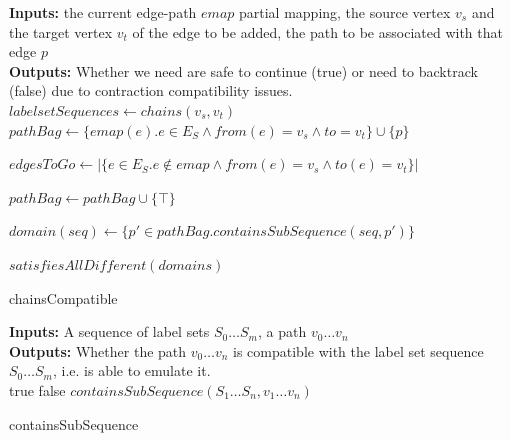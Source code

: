 \begin{algorithm}
\SetAlgoLined
\LinesNumbered
\textbf{Inputs: } the current edge-path $\mathit{emap}$ partial mapping, the source vertex $v_s$ and the target vertex $v_t$ of the edge to be added, the path to be associated with that edge $p$\\
\textbf{Outputs: } Whether we need are safe to continue (true) or need to backtrack (false) due to contraction compatibility issues.\\
$\mathit{labelsetSequences} \longleftarrow \mathit{chains}(v_s, v_t)$\;
$\mathit{pathBag} \longleftarrow \{\mathit{emap}(e) . e \in E_S \land \mathit{from}(e)=v_s \land \mathit{to}=v_t \} \cup \{p\}$\;

$\mathit{edgesToGo} \longleftarrow |\{e \in E_S . e \not \in \mathit{emap} \land \mathit{from}(e)=v_s \land \mathit{to}(e)=v_t\}|$

 {
		$\mathit{pathBag}\longleftarrow \mathit{pathBag} \cup \{\top\}$\;	
}

 {
	$\mathit{domain}(\mathit{seq})\longleftarrow \{p' \in \mathit{pathBag} . \mathit{containsSubSequence}(\mathit{seq}, p')\}$\;
}

\Return $\mathit{satisfiesAllDifferent}(\mathit{domains})$\;

 \caption{chainsCompatible}
 \label{algorithm:chainsCompatible}
\end{algorithm}


\begin{algorithm}
\SetAlgoLined
\LinesNumbered
\textbf{Inputs: } A sequence of label sets $S_0 \dots S_m$, a path $v_0 \dots v_n$\\
\textbf{Outputs: } Whether the path $v_0 \dots v_n$ is compatible with the label set sequence $S_0 \dots S_m$, i.e. is able to emulate it.\\
  {
	\Return true\;
}  {
	\Return false\;
}  {
	\Return $\mathit{containsSubSequence}(S_1 \dots S_n, v_1 \dots v_n)$\;
} 
 \caption{containsSubSequence}
 \label{algorithm:containsSubSequence}
\end{algorithm}
